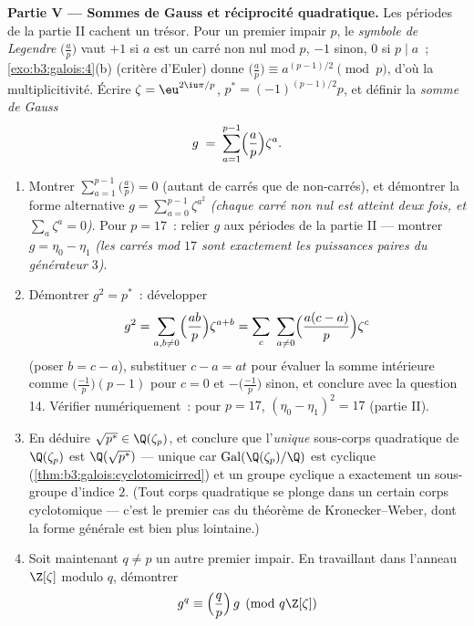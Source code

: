 \begin{problem}
\medskip
\noindent\textbf{Partie V --- Sommes de Gauss et réciprocité
quadratique.} Les périodes de la partie II cachent un trésor.
Pour un premier impair $p$, le \emph{symbole de Legendre}
$\bigl(\frac ap\bigr)$ vaut $+1$ si $a$ est un carré non nul
mod $p$, $-1$ sinon, $0$ si $p \mid a$~;
\cref{exo:b3:galois:4}(b) (critère d'Euler) donne
$\bigl(\frac ap\bigr) \equiv a^{(p-1)/2} \pmod p$, d'où la
multiplicitivité. Écrire $\zeta = \eu^{2\iu\pi/p}$, $p^* =
(-1)^{(p-1)/2}p$, et définir la \emph{somme de Gauss}
\[
g \;=\; \sum_{a=1}^{p-1}\Bigl(\frac ap\Bigr)\zeta^a .
\]
\begin{enumerate}[resume]
  \item Montrer $\sum_{a=1}^{p-1}\bigl(\frac ap\bigr) = 0$
        (autant de carrés que de non-carrés), et démontrer la
        forme alternative $g = \sum_{a=0}^{p-1}\zeta^{a^2}$
        \emph{(chaque carré non nul est atteint deux fois, et
        $\sum_{a}\zeta^a = 0$)}. Pour $p = 17$~: relier $g$
        aux périodes de la partie II --- montrer $g = \eta_0 -
        \eta_1$ \emph{(les carrés mod $17$ sont exactement les
        puissances paires du générateur $3$)}.
  \item Démontrer $g^2 = p^*$~: développer
        \[
        g^2 = \sum_{a,b\neq0}\Bigl(\frac{ab}p\Bigr)
        \zeta^{a+b}
        = \sum_{c}\ \sum_{a \neq 0}\Bigl(\frac{a(c -
        a)}p\Bigr)\zeta^{c}
        \]
        (poser $b = c - a$), substituer $c - a = at$ pour
        évaluer la somme intérieure comme
        $\bigl(\frac{-1}p\bigr)(p - 1)$ pour $c = 0$ et
        $-\bigl(\frac{-1}p\bigr)$ sinon, et conclure avec la
        question 14. Vérifier numériquement~: pour $p = 17$,
        $(\eta_0 - \eta_1)^2 = 17$ (partie II).
  \item En déduire $\sqrt{p^*} \in \Q(\zeta_p)$, et conclure
        que l'\emph{unique} sous-corps quadratique de
        $\Q(\zeta_p)$ est $\Q(\sqrt{p^*})$ --- unique car
        $\operatorname{Gal}(\Q(\zeta_p)/\Q)$ est cyclique
        (\cref{thm:b3:galois:cyclotomicirred}) et un groupe
        cyclique a exactement un sous-groupe d'indice $2$.
        (Tout corps quadratique se plonge dans un certain
        corps cyclotomique --- c'est le premier cas du
        théorème de Kronecker--Weber, dont la forme générale
        est bien plus lointaine.)
  \item Soit maintenant $q \neq p$ un autre premier impair. En
        travaillant dans l'anneau $\Z[\zeta]$ modulo $q$,
        démontrer
        \[
        g^q \equiv \Bigl(\frac qp\Bigr)\,g \pmod{q\Z[\zeta]}
        \]

\end{enumerate}
\end{problem}
